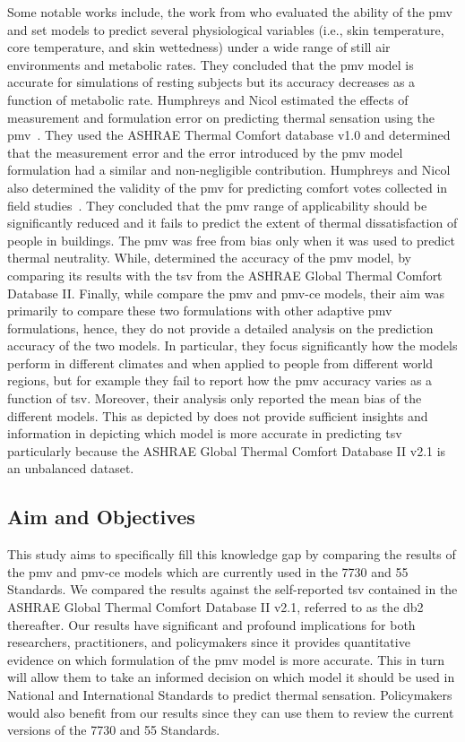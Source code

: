 Some notable works include, the work from  who evaluated the ability of the \ac{pmv} and \ac{set} models to predict several physiological variables (i.e., skin temperature, core temperature, and skin wettedness) under a wide range of still air environments and metabolic rates.
They concluded that the \ac{pmv} model is accurate for simulations of resting subjects but its accuracy decreases as a function of metabolic rate.
Humphreys and Nicol estimated the effects of measurement and formulation error on predicting thermal sensation using the \ac{pmv}~\cite{Humphreys2000}.
They used the ASHRAE Thermal Comfort database v1.0 and determined that the measurement error and the error introduced by the \ac{pmv} model formulation had a similar and non-negligible contribution.
Humphreys and Nicol also determined the validity of the \ac{pmv} for predicting comfort votes collected in field studies~\cite{Humphreys2002}.
They concluded that the \ac{pmv} range of applicability should be significantly reduced and it fails to predict the extent of thermal dissatisfaction of people in buildings.
The \ac{pmv} was free from bias only when it was used to predict thermal neutrality.
While,  determined the accuracy of the \ac{pmv} model, by comparing its results with the \ac{tsv} from the ASHRAE Global Thermal Comfort Database II.
Finally, while  compare the \ac{pmv} and \gls{pmv-ce} models, their aim was primarily to compare these two formulations with other adaptive \ac{pmv} formulations, hence, they do not provide a detailed analysis on the prediction accuracy of the two models.
In particular, they focus significantly how the models perform in different climates and when applied to people from different world regions, but for example they fail to report how the \ac{pmv} accuracy varies as a function of \ac{tsv}.
Moreover, their analysis only reported the mean bias of the different models.
This as depicted by  does not provide sufficient insights and information in depicting which model is more accurate in predicting \ac{tsv} particularly because the ASHRAE Global Thermal Comfort Database II v2.1 is an unbalanced dataset.

\subsection{Aim and Objectives}\label{subsec:aim-and-objectives}
This study aims to specifically fill this knowledge gap by comparing the results of the \ac{pmv} and \gls{pmv-ce} models which are currently used in the \gls{7730} and \gls{55} Standards.
We compared the results against the self-reported \ac{tsv} contained in the ASHRAE Global Thermal Comfort Database II v2.1, referred to as the \gls{db2} thereafter.
Our results have significant and profound implications for both researchers, practitioners, and policymakers since it provides quantitative evidence on which formulation of the \ac{pmv} model is more accurate.
This in turn will allow them to take an informed decision on which model it should be used in National and International Standards to predict thermal sensation.
Policymakers would also benefit from our results since they can use them to review the current versions of the \gls{7730} and \gls{55} Standards.